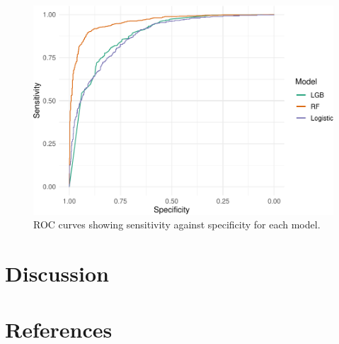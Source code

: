 \documentclass[]{elsarticle} %
\begin{document}
\begin{figure}
\centering
\includegraphics{report_files/figure-latex/auc-1.pdf}
\caption{\label{fig:auc}ROC curves showing sensitivity against specificity for each model.}
\end{figure}

\hypertarget{discussion}{%
\section{Discussion}\label{discussion}}

\hypertarget{references}{%
\section*{References}\label{references}}
\end{document}
